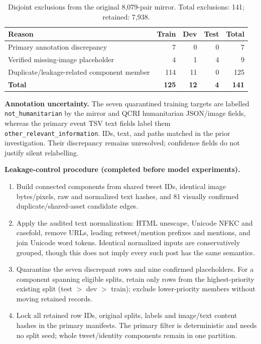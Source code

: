 \documentclass[11pt,a4paper]{article}
\begin{document}
\begin{table}[htbp]
\centering\small
\caption{Disjoint exclusions from the original 8,079-pair mirror. Total exclusions: 141; retained: 7,938.}
\label{tab:exclusions}
\begin{tabularx}{\linewidth}{@{}>{\raggedright\arraybackslash}Xrrrr@{}}
\toprule
Reason & Train & Dev & Test & Total \\
\midrule
Primary annotation discrepancy & 7 & 0 & 0 & 7 \\
Verified missing-image placeholder & 4 & 1 & 4 & 9 \\
Duplicate/leakage-related component member & 114 & 11 & 0 & 125 \\
\midrule
\textbf{Total} & \textbf{125} & \textbf{12} & \textbf{4} & \textbf{141} \\
\bottomrule
\end{tabularx}
\end{table}
\textbf{Annotation uncertainty.} The seven quarantined training targets are labelled \texttt{not\_humanitarian} by the mirror and QCRI humanitarian JSON/image fields, whereas the primary event TSV text fields label them \texttt{other\_relevant\_information}. IDs, text, and paths matched in the prior investigation. Their discrepancy remains unresolved; confidence fields do not justify silent relabelling.

\textbf{Leakage-control procedure (completed before model experiments).}
\begin{enumerate}[label=\arabic*.,itemsep=2pt]
\item Build connected components from shared tweet IDs, identical image bytes/pixels, raw and normalized text hashes, and 81 visually confirmed duplicate/shared-asset candidate edges.
\item Apply the audited text normalization: HTML unescape, Unicode NFKC and casefold, remove URLs, leading retweet/mention prefixes and mentions, and join Unicode word tokens. Identical normalized inputs are conservatively grouped, though this does not imply every such post has the same semantics.
\item Quarantine the seven discrepant rows and nine confirmed placeholders. For a component spanning eligible splits, retain only rows from the highest-priority existing split (test $>$ dev $>$ train); exclude lower-priority members without moving retained records.
\item Lock all retained row IDs, original splits, labels and image/text content hashes in the primary manifests. The primary filter is deterministic and needs no split seed; whole tweet/identity components remain in one partition.
\end{enumerate}
\end{document}
